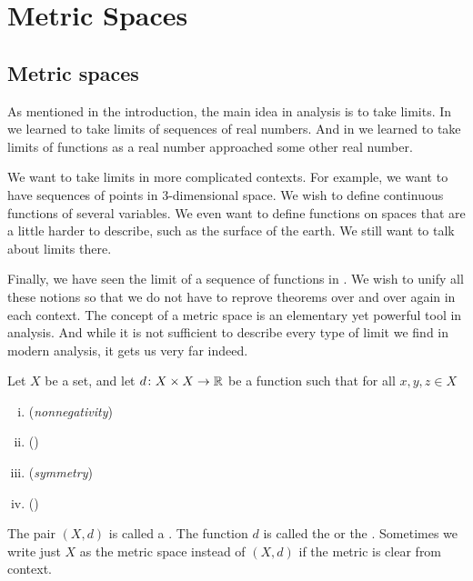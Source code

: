\chapter{Metric Spaces} \label{ms:chapter}


\section{Metric spaces}
\label{sec:metric}


As mentioned in the introduction, the main idea in analysis is to take
limits.  In  we learned to take limits of sequences of
real numbers.  And in  we learned to take limits
of functions as a real number approached some other real number.

We want to take limits in more complicated contexts.  For
example, we want to have sequences of points in 3-dimensional space.
We wish to define continuous functions of several variables.
We even want to define functions on spaces that are a little harder to
describe, such as the surface of the earth.  We still want to talk about
limits there.

Finally, we have seen the limit of a sequence of
functions in .
We wish to unify all these notions so that we do not have to
reprove theorems over and over again in each context.  The concept of a
metric space is an elementary yet powerful tool in analysis.  And while it
is not sufficient to describe every type of limit we find in modern
analysis, it gets us very far indeed.

\begin{defn}
Let $X$ be a set, and let
$d \colon X \times X \to {\mathbb{R}}$
be a function such that for all $x,y,z \in X$
\begin{enumerate}[(i)]
%
\item \label{metric:pos}
(\emph{nonnegativity})
%
\item \label{metric:zero}
(\emph{})
%
\item \label{metric:com}
(\emph{symmetry})
%
\item \label{metric:triang}
(\emph{})
\end{enumerate}
The pair $(X,d)$ is called a \emph{}.  The
function $d$ is called the \emph{} or the
\emph{}.
Sometimes we write just $X$ as the metric space instead of $(X,d)$
if the metric is clear from context.
\end{defn}

